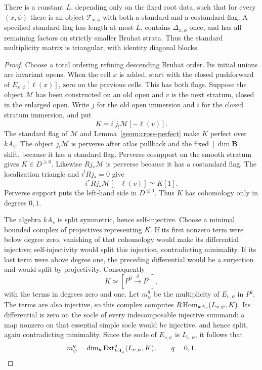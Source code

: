 \begin{proposition}\label{geom:bounded-tiltings}
There is a constant \(L\), depending only on the fixed root data,
such that for every \((x,\phi)\) there is an object
\(\mathcal T_{x,\phi}\) with both a standard and a costandard flag.
A specified standard flag has length at most \(L\), contains
\(\Delta_{x,\phi}\) once, and has all remaining factors on strictly
smaller Bruhat strata. Thus the standard multiplicity matrix is
triangular, with identity diagonal blocks.
\end{proposition}

\begin{proof}
Choose a total ordering refining descending Bruhat order. Its initial
unions are invariant opens. When the cell \(x\) is added, start with
the closed pushforward of \(E_{x,\phi}[\ell(x)]\), zero on the
previous cells. This has both flags. Suppose the object \(\mathcal M\)
has been constructed on an old open and \(v\) is the next stratum,
closed in the enlarged open. Write \(j\) for the old open immersion
and \(i\) for the closed stratum immersion, and put
\[
 K=i^!j_!\mathcal M[-\ell(v)].
\]
The standard flag of \(\mathcal M\) and Lemma~\ref{geom:cross-perfect}
make \(K\) perfect over \(kA_v\).
The object \(j_!\mathcal M\) is perverse after atlas pullback and the
fixed \([\dim\mathbf B]\) shift, because it has a standard flag.
Perverse cosupport on the smooth stratum gives \(K\in D^{\ge0}\).
Likewise \(Rj_*\mathcal M\) is perverse because it has a costandard
flag. The localization triangle and \(i^!Rj_*=0\) give
\[
 i^*Rj_*\mathcal M[-\ell(v)]\simeq K[1].
\]
Perverse support puts the left-hand side in \(D^{\le0}\).
Thus \(K\) has cohomology only in degrees \(0,1\).

The algebra \(kA_v\) is split symmetric, hence self-injective. Choose
a minimal bounded complex of projectives representing \(K\).
If its first nonzero term were below degree zero, vanishing of that
cohomology would make its differential injective; self-injectivity
would split this injection, contradicting minimality. If its last
term were above degree one, the preceding differential would be a
surjection and would split by projectivity. Consequently
\[
 K\simeq[P^0\xrightarrow{\delta}P^1],
\]
with the terms in degrees zero and one.
Let \(m^q_\psi\) be the multiplicity of \(E_{v,\psi}\) in \(P^q\).
The terms are also injective, so this complex computes
\(R\operatorname{Hom}_{kA_v}(L_{v,\psi},K)\). Its differential is zero on the
socle of every indecomposable injective summand: a map nonzero on
that essential simple socle would be injective, and hence split,
again contradicting minimality. Since the socle of \(E_{v,\psi}\)
is \(L_{v,\psi}\), it follows that
\begin{equation}\label{geom:multiplicity-ext}
 m^q_\psi=
 \dim_k\operatorname{Ext}^q_{kA_v}(L_{v,\psi},K),\qquad q=0,1.
\end{equation}


\end{proof}
